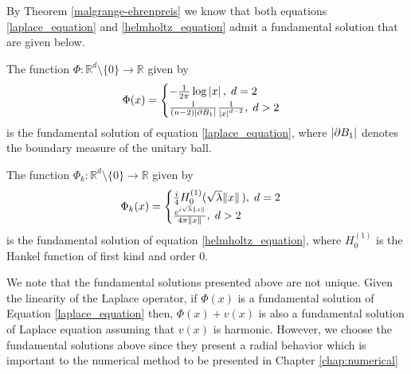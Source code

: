 By Theorem \ref{malgrange-ehrenpreis} we know that both equations \eqref{laplace_equation} and \eqref{helmholtz_equation} admit a fundamental solution that are given below.

\begin{proposition}
    The function \(\Phi: \mathbb{R}^d \setminus \{0\} \rightarrow \mathbb{R}\) given by
    \[
    \Phi(x) = \begin{cases}
        -\frac{1}{2 \pi} \log \abs*{x}, \; d=2\\
        \frac{1}{(n-2)\abs{\partial B_1}}\frac{1}{\abs*{x}^{d-2}}, \; d > 2
    \end{cases}    
    \]
    is the fundamental solution of equation \eqref{laplace_equation}, where \(\abs{\partial B_1}\) denotes the boundary measure of the unitary ball.
\end{proposition}
\begin{proposition}\label{helm_fund_sol}
    The function \(\Phi_k: \mathbb{R}^d \setminus \{0\} \rightarrow \mathbb{R}\) given by
    \[
    \Phi_k(x) = \begin{cases}
        \frac{i}{4} H_0^{(1)}(\sqrt{\lambda} \norm*{x}), \; d=2\\
        \frac{e^{i \sqrt{\lambda} \norm*{x}}}{4 \pi \norm*{x}}, \; d > 2
    \end{cases}    
    \]
    is the fundamental solution of equation \eqref{helmholtz_equation}, where \(H_0^{(1)}\) is the Hankel function of first kind and order 0.
\end{proposition}

\begin{remark}
    We note that the fundamental solutions presented above are not unique. Given the linearity of the Laplace operator, if \(\Phi(x)\) is a fundamental solution of Equation \ref*{laplace_equation} then, \(\Phi(x)+v(x)\) is also a fundamental solution of Laplace equation assuming that \(v(x)\) is harmonic. However, we choose the fundamental solutions above since they present a radial behavior which is important to the numerical method to be presented in Chapter \ref*{chap:numerical}
\end{remark}

